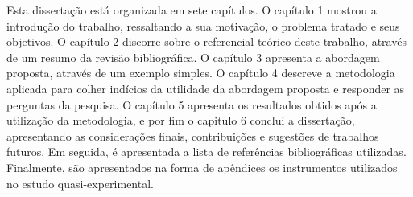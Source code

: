 Esta dissertação está organizada em sete capítulos. O capítulo 1 mostrou a introdução do trabalho, ressaltando a sua motivação, o problema tratado e seus objetivos. O capítulo 2 discorre sobre o referencial teórico deste trabalho, através de um resumo da revisão bibliográfica. O capítulo 3 apresenta a abordagem proposta, através de um exemplo simples. O capítulo 4 descreve a metodologia aplicada para colher indícios da utilidade da abordagem proposta e responder as perguntas da pesquisa. O capítulo 5 apresenta os resultados obtidos após a utilização da metodologia, e por fim o capitulo 6 conclui a dissertação, apresentando as considerações finais, contribuições e sugestões de trabalhos futuros. Em seguida, é apresentada a lista de referências bibliográficas utilizadas. Finalmente, são apresentados na forma de apêndices os instrumentos utilizados no estudo quasi-experimental.






